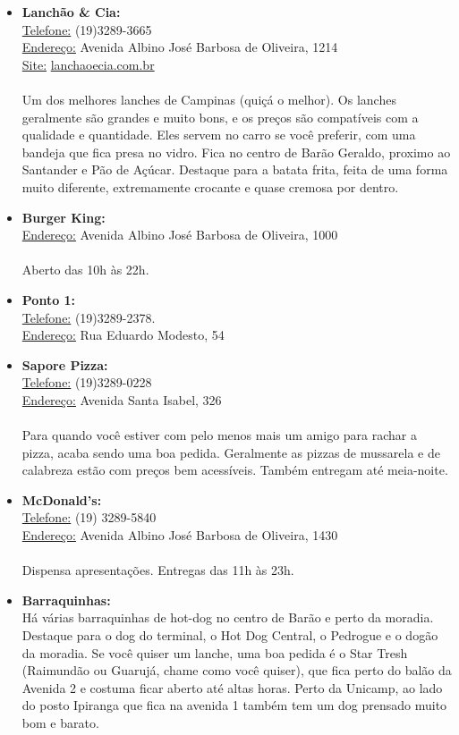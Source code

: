 \begin{itemize}
\item  \textbf{Lanchão \& Cia:}
\\\underline{Telefone:} (19)3289-3665
\\\underline{Endereço:} Avenida Albino José Barbosa de Oliveira, 1214
\\\underline{Site:} \url{lanchaoecia.com.br}
\\\\Um dos melhores lanches de Campinas (quiçá o melhor). Os lanches geralmente são grandes e muito bons, e os preços são compatíveis com a qualidade e quantidade. Eles servem no carro se você preferir, com uma bandeja que fica presa no vidro. Fica no centro de Barão Geraldo, proximo ao Santander e Pão de Açúcar. Destaque para a batata frita, feita de uma forma muito diferente, extremamente crocante e quase cremosa por dentro.

\item  \textbf{Burger King:}
\\\underline{Endereço:} Avenida Albino José Barbosa de Oliveira, 1000
\\\\Aberto das 10h às 22h.

\item  \textbf{Ponto 1:}
\\\underline{Telefone:} (19)3289-2378.
\\\underline{Endereço:} Rua Eduardo Modesto, 54

\item  \textbf{Sapore Pizza:}
\\\underline{Telefone:} (19)3289-0228
\\\underline{Endereço:} Avenida Santa Isabel, 326
\\\\Para quando você estiver com pelo menos mais um amigo para rachar a pizza, acaba sendo uma boa pedida. Geralmente as pizzas de mussarela e de calabreza estão com preços bem acessíveis. Também entregam até meia-noite.

\item  \textbf{McDonald's:}
\\\underline{Telefone:} (19) 3289-5840
\\\underline{Endereço:} Avenida Albino José Barbosa de Oliveira, 1430
\\\\Dispensa apresentações. Entregas das 11h às 23h.

\item  \textbf{Barraquinhas:}
\\Há várias barraquinhas de hot-dog no centro de Barão e perto da moradia. Destaque para o dog do terminal, o Hot Dog Central, o Pedrogue e o dogão da moradia. Se você quiser um lanche, uma boa pedida é o Star Tresh (Raimundão ou Guarujá, chame como você quiser), que fica perto do balão da Avenida 2 e costuma ficar aberto até altas horas. Perto da Unicamp, ao lado do posto Ipiranga que fica na avenida 1 também tem um dog prensado muito bom e barato.
\end{itemize}

